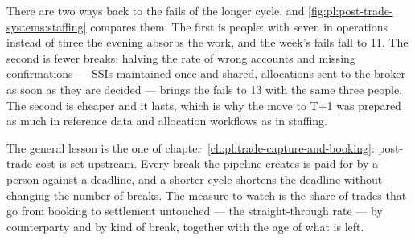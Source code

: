 There are two ways back to the fails of the longer cycle, and \cref{fig:pl:post-trade-systems:staffing} compares them. The first is people:
with seven in operations instead of three the evening absorbs the work, and the week's fails fall to 11. The second is fewer breaks: halving
the rate of wrong accounts and missing confirmations --- SSIs maintained once and shared, allocations sent to the broker as soon as they are
decided --- brings the fails to 13 with the same three people. The second is cheaper and it lasts, which is why the move to T+1 was prepared
as much in reference data and allocation workflows as in staffing.

\begin{omfigure}

\label{fig:pl:post-trade-systems:staffing}
\end{omfigure}

The general lesson is the one of chapter~\ref{ch:pl:trade-capture-and-booking}: post-trade cost is set upstream. Every break the pipeline
creates is paid for by a person against a deadline, and a shorter cycle shortens the deadline without changing the number of breaks. The
measure to watch is the share of trades that go from booking to settlement untouched --- the straight-through rate --- by counterparty and by
kind of break, together with the age of what is left.

